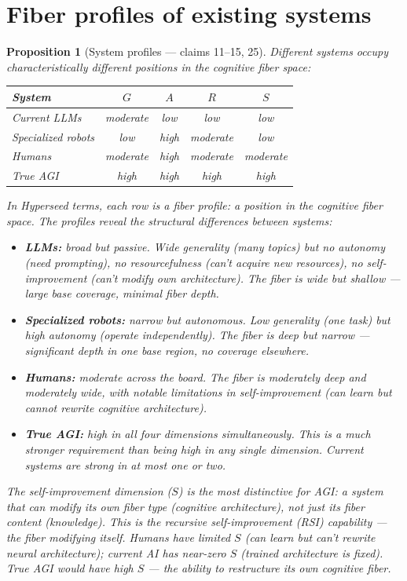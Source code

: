 \documentclass[11pt,a4paper]{article}
\newtheorem{proposition}[definition]{Proposition}
\begin{document}

\section{Fiber profiles of existing systems}
\label{sec:profiles}

\begin{proposition}[System profiles --- claims 11--15, 25]
\label{prop:profiles}
Different systems occupy characteristically different positions in the
cognitive fiber space:

\begin{center}
\begin{tabular}{lcccc}
\textbf{System} & $G$ & $A$ & $R$ & $S$ \\
\hline
Current LLMs & moderate & low & low & low \\
Specialized robots & low & high & moderate & low \\
Humans & moderate & high & moderate & moderate \\
True AGI & high & high & high & high \\
\end{tabular}
\end{center}

In Hyperseed terms, each row is a \emph{fiber profile}: a position
in the cognitive fiber space. The profiles reveal the structural
differences between systems:
\begin{itemize}
\item \textbf{LLMs:} broad but passive. Wide generality (many topics)
  but no autonomy (need prompting), no resourcefulness (can't acquire
  new resources), no self-improvement (can't modify own architecture).
  The fiber is wide but shallow --- large base coverage, minimal
  fiber depth.
\item \textbf{Specialized robots:} narrow but autonomous. Low generality
  (one task) but high autonomy (operate independently). The fiber is
  deep but narrow --- significant depth in one base region, no coverage
  elsewhere.
\item \textbf{Humans:} moderate across the board. The fiber is
  moderately deep and moderately wide, with notable limitations in
  self-improvement (can learn but cannot rewrite cognitive architecture).
\item \textbf{True AGI:} high in all four dimensions simultaneously.
  This is a much stronger requirement than being high in any single
  dimension. Current systems are strong in at most one or two.
\end{itemize}

The self-improvement dimension ($S$) is the most distinctive for AGI:
a system that can modify its own fiber type (cognitive architecture),
not just its fiber content (knowledge). This is the recursive
self-improvement (RSI) capability --- the fiber modifying itself.
Humans have limited $S$ (can learn but can't rewrite neural
architecture); current AI has near-zero $S$ (trained architecture
is fixed). True AGI would have high $S$ --- the ability to
restructure its own cognitive fiber.
\end{proposition}
\end{document}
